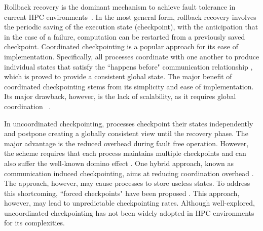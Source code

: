 Rollback recovery is the dominant mechanism to achieve fault
tolerance in current HPC environments~\cite{Elnozahy:02:Survey}. In the most general form, rollback recovery 
involves the periodic saving of the execution state (checkpoint), with the anticipation that
in the case of a failure, computation can be restarted from a previously saved checkpoint. %
Coordinated checkpointing is a popular approach for
its ease of implementation.
Specifically, all processes
coordinate with one another to produce individual states that satisfy the ``happens before"
communication relationship \cite{chandy_trans_1972}, which is proved to provide a consistent global state.
The major benefit of coordinated checkpointing stems from its simplicity and ease of implementation. 
Its major drawback, however, is the lack of scalability, as it requires global coordination
~\cite{elnozahy_dsc_2004,riesen_sandia_2010}.


In uncoordinated checkpointing, processes checkpoint their states independently and postpone creating a 
globally consistent view until the recovery phase. The major advantage is the reduced overhead during fault free operation. However, the scheme requires that
each process maintains multiple checkpoints %
and can also suffer the well-known domino effect 
 \cite{randell_domino_effect,alvisi_ftc_1999,helary_rds_1997}. One hybrid approach, known as communication induced 
checkpointing, aims at reducing coordination overhead \cite{alvisi_ftc_1999}. The approach, however, may 
cause processes to store useless states. To address this 
shortcoming, ``forced checkpoints" have been proposed \cite{helary_rds_1997}. This approach, however,  may lead to unpredictable
checkpointing rates. 
Although well-explored, uncoordinated checkpointing has not been widely adopted
in HPC environments for its complexities. 


